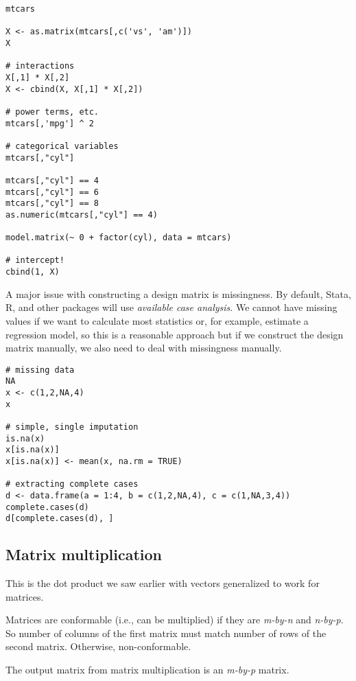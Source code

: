 \documentclass[a4paper,12pt]{article}
\begin{document}
\begin{lstlisting}
mtcars

X <- as.matrix(mtcars[,c('vs', 'am')])
X

# interactions
X[,1] * X[,2]
X <- cbind(X, X[,1] * X[,2])

# power terms, etc.
mtcars[,'mpg'] ^ 2

# categorical variables
mtcars[,"cyl"]

mtcars[,"cyl"] == 4
mtcars[,"cyl"] == 6
mtcars[,"cyl"] == 8
as.numeric(mtcars[,"cyl"] == 4)

model.matrix(~ 0 + factor(cyl), data = mtcars)

# intercept!
cbind(1, X)

\end{lstlisting}


A major issue with constructing a design matrix is missingness. By default, Stata, R, and other packages will use \textit{available case analysis}. We cannot have missing values if we want to calculate most statistics or, for example, estimate a regression model, so this is a reasonable approach but if we construct the design matrix manually, we also need to deal with missingness manually.

\begin{lstlisting}
# missing data
NA
x <- c(1,2,NA,4)
x

# simple, single imputation
is.na(x)
x[is.na(x)]
x[is.na(x)] <- mean(x, na.rm = TRUE)

# extracting complete cases
d <- data.frame(a = 1:4, b = c(1,2,NA,4), c = c(1,NA,3,4))
complete.cases(d)
d[complete.cases(d), ]
\end{lstlisting}


\subsection{Matrix multiplication}

This is the dot product we saw earlier with vectors generalized to work for matrices.

Matrices are conformable (i.e., can be multiplied) if they are \textit{m-by-n} and \textit{n-by-p}. So number of columns of the first matrix must match number of rows of the second matrix. Otherwise, non-conformable.

The output matrix from matrix multiplication is an \textit{m-by-p} matrix.
\end{document}
